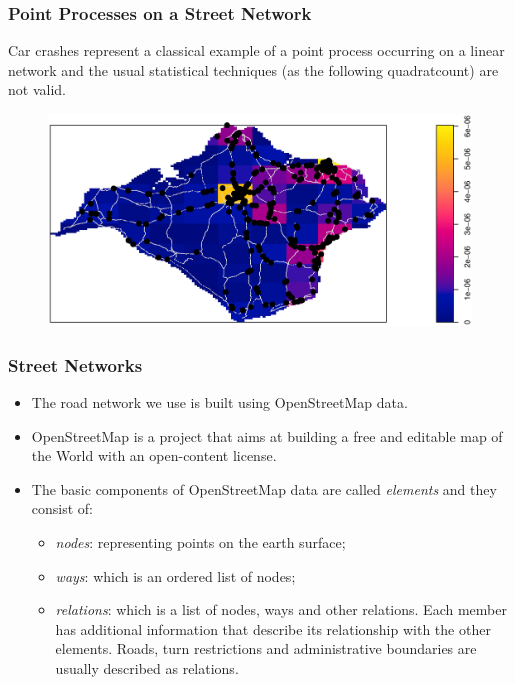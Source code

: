 \documentclass[c,10pt,pdftex]{beamer}
\begin{document}
\begin{frame}
\frametitle{Point Processes on a Street Network}
\vspace{-0.25cm}
Car crashes represent a classical example of a point process occurring on a linear network and the usual statistical techniques (as the following quadratcount) are not valid. 
\vspace{-0.5cm}
\begin{figure}
	\centering
	\includegraphics[width=\linewidth]{images/quadratcount2}
\end{figure}
\end{frame}

\begin{frame}
\frametitle{Street Networks}
\vspace{-0.75cm}
\begin{itemize}
  \setlength\itemsep{1em}
  \item The road network we use is built using OpenStreetMap data. 
  \item OpenStreetMap is a project that aims at building a free and editable map of the World with an open-content license. 
  \item The basic components of OpenStreetMap data are called \textit{elements} and they consist of: 
  \begin{itemize}
    \setlength\itemsep{0.25em}
    \item \textit{nodes}: representing points on the earth surface; 
    \item \textit{ways}: which is an ordered list of nodes; 
    \item \textit{relations}: which is a list of nodes, ways and other relations. Each member has additional information that describe its relationship with the other elements. Roads, turn restrictions and administrative boundaries are usually described as relations.
  \end{itemize}
\end{itemize}
\end{frame}
\end{document}
